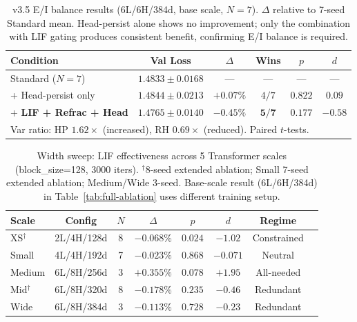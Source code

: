 \documentclass[11pt]{article}
\begin{document}
\begin{table}[h]
\centering
\caption{v3.5 E/I balance results (6L/6H/384d, base scale, $N{=}7$). $\Delta$ relative to 7-seed Standard mean. Head-persist alone shows no improvement; only the combination with LIF gating produces consistent benefit, confirming E/I balance is required.}
\label{tab:ei-balance}
\begin{tabular}{lccccc}
\toprule
\textbf{Condition} & \textbf{Val Loss} & \textbf{$\Delta$} & \textbf{Wins} & \textbf{$p$} & \textbf{$d$} \\
\midrule
Standard ($N{=}7$) & $1.4833 \pm 0.0168$ & --- & --- & --- & --- \\
+ Head-persist only & $1.4844 \pm 0.0213$ & $+0.07\%$ & $4/7$ & $0.822$ & $0.09$ \\
+ \textbf{LIF + Refrac + Head} & $\mathbf{1.4765 \pm 0.0140}$ & $\mathbf{-0.45\%}$ & $\mathbf{5/7}$ & $0.177$ & $-0.58$ \\
\bottomrule
\multicolumn{6}{l}{\footnotesize Var ratio: HP $1.62\times$ (increased), RH $0.69\times$ (reduced). Paired $t$-tests.} \\
\end{tabular}
\end{table}

\begin{table}[h]
\centering
\caption{Width sweep: LIF effectiveness across 5 Transformer scales (block\_size=128, 3000 iters). $^\dagger$8-seed extended ablation; Small 7-seed extended ablation; Medium/Wide 3-seed. Base-scale result (6L/6H/384d) in Table~\ref{tab:full-ablation} uses different training setup.}
\label{tab:cross-scale}
\begin{tabular}{lccccccc}
\toprule
\textbf{Scale} & \textbf{Config} & \textbf{$N$} & \textbf{$\Delta$} & \textbf{$p$} & \textbf{$d$} & \textbf{Regime} \\
\midrule
XS$^\dagger$ & 2L/4H/128d & 8 & $-0.068\%$ & $0.024$ & $-1.02$ & Constrained \\
Small & 4L/4H/192d & 7 & $-0.023\%$ & $0.868$ & $-0.071$ & Neutral \\
Medium & 6L/8H/256d & 3 & $+0.355\%$ & $0.078$ & $+1.95$ & All-needed \\
Mid$^\dagger$ & 6L/8H/320d & 8 & $-0.178\%$ & $0.235$ & $-0.46$ & Redundant \\
Wide & 6L/8H/384d & 3 & $-0.113\%$ & $0.728$ & $-0.23$ & Redundant \\
\bottomrule
\end{tabular}
\end{table}
\end{document}
